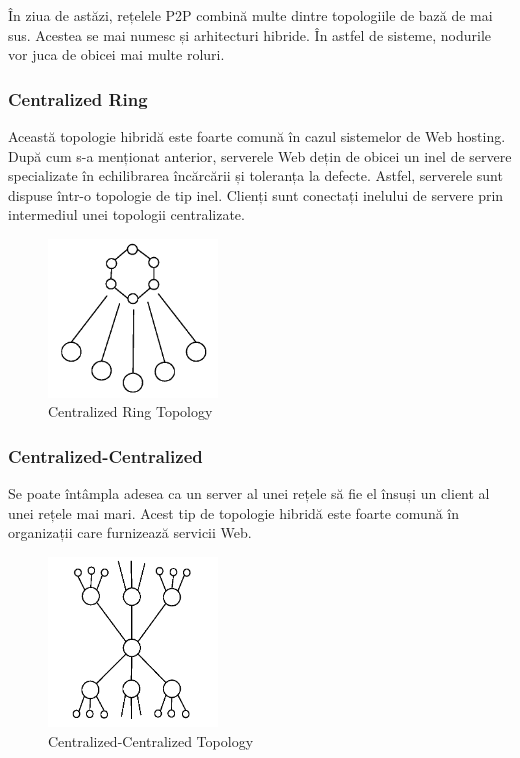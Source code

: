 În ziua de astăzi, rețelele P2P combină multe dintre topologiile de bază de
mai sus. Acestea se mai numesc și arhitecturi hibride. În astfel de sisteme,
nodurile vor juca de obicei mai multe roluri.

\subsubsection{Centralized Ring}

Această topologie hibridă este foarte comună în cazul sistemelor de Web
hosting. După cum s-a menționat anterior, serverele Web dețin de obicei un
inel de servere specializate în echilibrarea încărcării și toleranța la
defecte. Astfel, serverele sunt dispuse într-o topologie de tip inel. Clienți
sunt conectați inelului de servere prin intermediul unei topologii
centralizate.

\begin{figure}
  \centering
  \includegraphics[width=0.4\textwidth]{src/img/p2p-systems/centralized-ring}
  \caption{Centralized Ring Topology}
  \label{fig:p2p-systems:centralized-ring}
\end{figure}

\subsubsection{Centralized-Centralized}

Se poate întâmpla adesea ca un server al unei rețele să fie el însuși un
client al unei rețele mai mari. Acest tip de topologie hibridă este foarte
comună în organizații care furnizează servicii Web.

\begin{figure}
  \centering
  \includegraphics[width=0.4\textwidth]{src/img/p2p-systems/centralized-centralized}
  \caption{Centralized-Centralized Topology}
  \label{fig:p2p-systems:centralized-centralized}
\end{figure}

